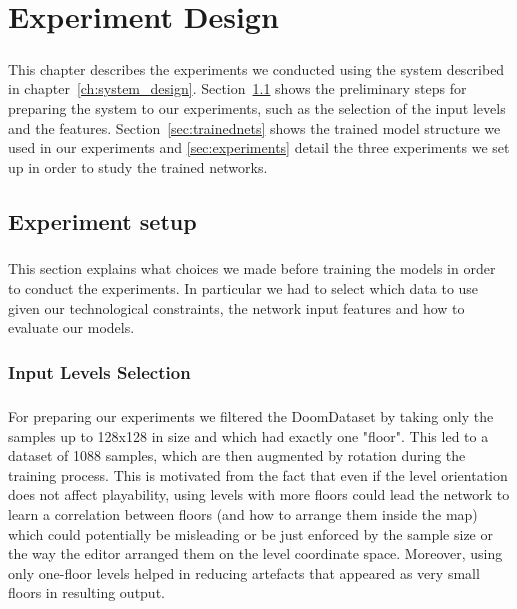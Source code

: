 \chapter{Experiment Design}
\label{ch:experiment}
\paragraph{} This chapter describes the experiments we conducted using the system described in chapter~\ref{ch:system_design}. Section~\ref{sec:experimentdesign} shows the preliminary steps for preparing the system to our experiments, such as the selection of the input levels and the features. Section~\ref{sec:trainednets} shows the trained model structure we used in our experiments and \ref{sec:experiments} detail the three experiments we set up in order to study the trained networks.

\section{Experiment setup}
\label{sec:experimentdesign}
\paragraph{} This section explains what choices we made before training the models in order to conduct the experiments. In particular we had to select which data to use given our technological constraints, the network input features and how to evaluate our models.

\subsection{Input Levels Selection}
\label{sec:InputSelection}
\paragraph{} For preparing our experiments we filtered the DoomDataset by taking only the samples up to 128x128 in size and which had exactly one "floor". This led to a dataset of 1088 samples, which are then augmented by rotation during the training process. This is motivated from the fact that even if the level orientation does not affect playability, using levels with more floors could lead the network to learn a correlation between floors (and how to arrange them inside the map) which could potentially be misleading or be just enforced by the sample size or the way the editor arranged them on the level coordinate space. Moreover, using only one-floor levels helped in reducing artefacts that appeared as very small floors in resulting output.

